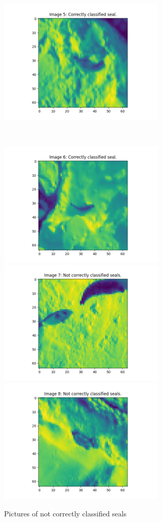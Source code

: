 \documentclass[12pt, letterpaper]{article}
\begin{document}
\begin{figure}[H]
        \includegraphics[width=8cm]{corr5}
      \end{figure}\\
      \begin{figure}[H]
        \caption{Pictures of not correctly classified seals}
        \centering
        \includegraphics[width=8cm]{notcorr6}
        \includegraphics[width=8cm]{notcorr7}
        \includegraphics[width=8cm]{notcorr8}

\end{figure}
\end{document}
